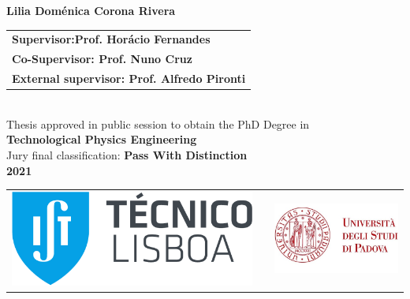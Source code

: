 {\vspace{2cm}
{\FontNam \textbf{Lilia Dom\'enica Corona Rivera}} \\
\vspace{2cm}
{\FontS %
\begin{tabular}{l}
	\FontL
\textbf{Supervisor:Prof. Hor\'acio Fernandes} \\
	\FontL\textbf{Co-Supervisor: Prof. Nuno Cruz}\\
	\FontL\textbf{External supervisor: Prof. Alfredo Pironti}\\
\end{tabular} } \\
\vspace{1.8cm}
{\FontM Thesis approved in public session to obtain the PhD Degree in} \\
\vspace{1.8mm}
{\FontL \textbf{Technological Physics Engineering}} \\
\vspace{1.8cm}
{\FontL Jury final classification: \textbf{Pass With Distinction}}\\
\vspace{1.8cm}
{\FontM \textbf{2021}} \\


\newpage
\thispagestyle{empty}




\begin{tabular}{>{\raggedleft}m{5cm}>{\centering}m{\dimexpr\textwidth - 10cm\relax}>{\raggedright}m{5cm}}
	\includegraphics[width=\linewidth]{includes/LogoIST.pdf}%
	&
	&%
	\includegraphics[width=\linewidth]{includes/LogoPadova.jpg} %
\end{tabular}

}
